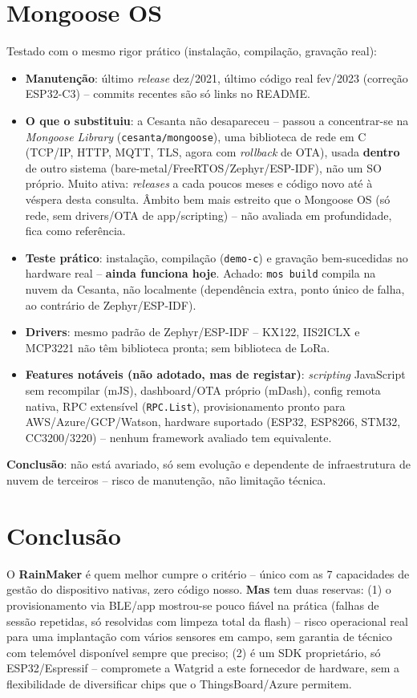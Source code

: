\documentclass[a4paper,11pt]{article}
\begin{document}
\section{Mongoose OS}
Testado com o mesmo rigor prático (instalação, compilação, gravação real):
\begin{itemize}
    \item \textbf{Manutenção}: último \textit{release} dez/2021, último código real fev/2023 (correção ESP32-C3) -- commits recentes são só links no README.
    \item \textbf{O que o substituiu}: a Cesanta não desapareceu -- passou a concentrar-se na \textit{Mongoose Library} (\texttt{cesanta/mongoose}), uma biblioteca de rede em C (TCP/IP, HTTP, MQTT, TLS, agora com \textit{rollback} de OTA), usada \textbf{dentro} de outro sistema (bare-metal/FreeRTOS/Zephyr/ESP-IDF), não um SO próprio. Muito ativa: \textit{releases} a cada poucos meses e código novo até à véspera desta consulta. Âmbito bem mais estreito que o Mongoose OS (só rede, sem drivers/OTA de app/scripting) -- não avaliada em profundidade, fica como referência.
    \item \textbf{Teste prático}: instalação, compilação (\texttt{demo-c}) e gravação bem-sucedidas no hardware real -- \textbf{ainda funciona hoje}. Achado: \texttt{mos build} compila na nuvem da Cesanta, não localmente (dependência extra, ponto único de falha, ao contrário de Zephyr/ESP-IDF).
    \item \textbf{Drivers}: mesmo padrão de Zephyr/ESP-IDF -- KX122, IIS2ICLX e MCP3221 não têm biblioteca pronta; sem biblioteca de LoRa.
    \item \textbf{Features notáveis (não adotado, mas de registar)}: \textit{scripting} JavaScript sem recompilar (mJS), dashboard/OTA próprio (mDash), config remota nativa, RPC extensível (\texttt{RPC.List}), provisionamento pronto para AWS/Azure/GCP/Watson, hardware suportado (ESP32, ESP8266, STM32, CC3200/3220) -- nenhum framework avaliado tem equivalente.
\end{itemize}
\textbf{Conclusão}: não está avariado, só sem evolução e dependente de infraestrutura de nuvem de terceiros -- risco de manutenção, não limitação técnica.

\section{Conclusão}



O \textbf{RainMaker} é quem melhor cumpre o critério -- único com as 7 capacidades de gestão do dispositivo nativas, zero código nosso. \textbf{Mas} tem duas reservas: (1) o provisionamento via BLE/app mostrou-se pouco fiável na prática (falhas de sessão repetidas, só resolvidas com limpeza total da flash) -- risco operacional real para uma implantação com vários sensores em campo, sem garantia de técnico com telemóvel disponível sempre que preciso; (2) é um SDK proprietário, só ESP32/Espressif -- compromete a Watgrid a este fornecedor de hardware, sem a flexibilidade de diversificar chips que o ThingsBoard/Azure permitem.
\end{document}
